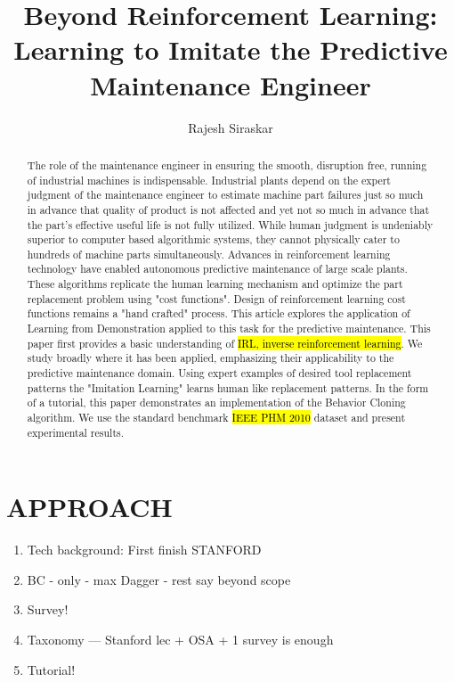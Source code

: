 \documentclass{article}
\title{Beyond Reinforcement Learning: Learning to Imitate the Predictive Maintenance Engineer}
\author{Rajesh Siraskar}
\newcommand{\hlc}[2][blue!10]{{\colorlet{foo}{#1} \sethlcolor{foo}\hl{#2}}}
\begin{document}
\maketitle
\begin{abstract}
	The role of the maintenance engineer in ensuring the smooth, disruption free, running of industrial machines is indispensable. Industrial plants depend on the expert judgment of the maintenance engineer to estimate machine part failures just so much in advance that quality of product is not affected and yet not so much in advance that the part's effective useful life is not fully utilized. While human judgment is undeniably superior to computer based algorithmic systems, they cannot physically cater to hundreds of machine parts simultaneously. Advances in reinforcement learning technology have enabled autonomous predictive maintenance of large scale plants. These algorithms replicate the human learning mechanism and optimize the part replacement problem using "cost functions". Design of reinforcement learning cost functions remains a "hand crafted" process. This article explores the application of Learning from Demonstration applied to this task for the predictive maintenance. This paper first provides a basic understanding of \hlc{IRL, inverse reinforcement learning}. We study broadly where it has been applied, emphasizing their applicability to the predictive maintenance domain. Using expert examples of desired tool replacement patterns the "Imitation Learning" learns human like replacement patterns. In the form of a tutorial, this paper demonstrates an implementation of the Behavior Cloning algorithm. We use the standard benchmark \hlc{IEEE PHM 2010} dataset and present experimental results.
\end{abstract}

\clearpage
\section{APPROACH}
\begin{enumerate}
	\item Tech background: First finish STANFORD
	\item \qquad BC - only - max Dagger - rest say beyond scope
	\item Survey!
	\item \qquad Taxonomy --- Stanford lec + OSA + 1 survey is enough
	\item Tutorial!
\end{enumerate}
\end{document}
